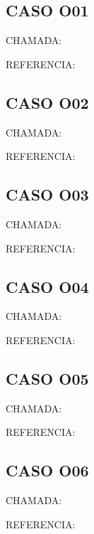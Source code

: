 \documentclass{undftex}
\begin{document}
\begin{refsection}\section*{CASO O01}\noindent CHAMADA: \par\noindent REFERENCIA:\par\printbibliography[heading=none]\end{refsection}\clearpage
\begin{refsection}\section*{CASO O02}\noindent CHAMADA: \par\noindent REFERENCIA:\par\printbibliography[heading=none]\end{refsection}\clearpage
\begin{refsection}\section*{CASO O03}\noindent CHAMADA: \par\noindent REFERENCIA:\par\printbibliography[heading=none]\end{refsection}\clearpage
\begin{refsection}\section*{CASO O04}\noindent CHAMADA: \par\noindent REFERENCIA:\par\printbibliography[heading=none]\end{refsection}\clearpage
\begin{refsection}\section*{CASO O05}\noindent CHAMADA: \par\noindent REFERENCIA:\par\printbibliography[heading=none]\end{refsection}\clearpage
\begin{refsection}\section*{CASO O06}\noindent CHAMADA: \par\noindent REFERENCIA:\par\printbibliography[heading=none]\end{refsection}\clearpage
\end{document}
